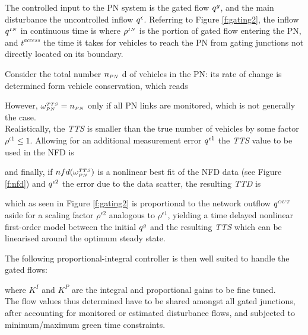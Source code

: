 The controlled input to the PN system is the gated flow $q^{g}$, and the main disturbance
the uncontrolled inflow $q^{\epsilon}$. Referring to Figure \ref{f:gating2}, the inflow $q^{\scriptscriptstyle{IN}}$ in continuous time is 
where $\rho^{\scriptscriptstyle{IN}}$ is the portion of gated flow entering the PN, and $t^{access}$ the time it takes for vehicles to reach the PN from gating junctions not directly located on its boundary.

Consider the total number $n_{\scriptscriptstyle{PN}}$ d of vehicles in the PN: its rate of change is determined
form vehicle conservation, which reads

However, $\omega_{\scriptscriptstyle{PN}}^{\scriptscriptstyle{TTS}} = n_{\scriptscriptstyle{PN}} $ only if all PN links are monitored, which is not generally the case.\\
Realistically, the \emph{TTS} is smaller than the true number of vehicles by some factor $\rho^{\epsilon 1} \leq 1$.
Allowing for an additional measurement error $q^{\epsilon 1}$ the \emph{TTS} value to be used in the NFD is


and finally, if $nfd( \omega_{\scriptscriptstyle{PN}}^{\scriptscriptstyle{TTS}} )$ is a nonlinear best fit of the NFD data (see Figure \ref{f:nfd}) and $q^{\epsilon 2}$ the error due to the data scatter, the resulting \emph{TTD} is


which as seen in Figure \ref{f:gating2} is proportional to the network outflow $q^{\scriptscriptstyle{OUT}}$ aside for a scaling factor $\rho^{\epsilon 2}$ analogous to $\rho^{\epsilon 1}$, yielding a time delayed nonlinear first-order model between the initial $q^{g}$ and the resulting \emph{TTS} which can be linearised around the optimum steady state.

The following proportional-integral controller is then well suited to handle the gated flows:


where $K^{I}$ and $K^{P}$ are the integral and proportional gains to be fine tuned.\\
The flow values thus determined have to be shared amongst all gated junctions, after accounting for monitored or estimated disturbance flows, and subjected to minimum/maximum green time constraints.


